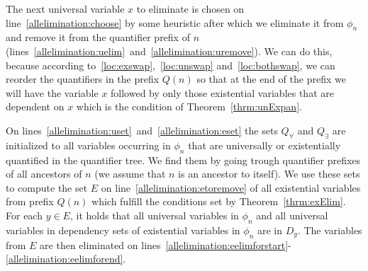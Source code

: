 \documentclass[
  digital, %
  color,
  twoside, %
  table,   %
  nolof,     %
  nolot,     %
]{fithesis3}
\theoremstyle{definition}
\theoremstyle{remark}
\newcommand{\prefix}[1]{Q({#1})}
\begin{document}
The next universal variable $x$ to eliminate is chosen on line~\ref{allelimination:choose} by some heuristic after which we eliminate it from $\phi_n$ and remove it from the quantifier prefix of $n$ (lines~\ref{allelimination:uelim}~and~\ref{allelimination:uremove}). We can do this, because according to~\eqref{loc:exswap},~\eqref{loc:unswap} and~\eqref{loc:bothswap}, we can reorder the quantifiers in the prefix $\prefix{n}$ so that at the end of the prefix we will have the variable $x$ followed by only those existential variables that are dependent on $x$ which is the condition of Theorem~\ref{thrm:unExpan}.

On lines~\ref{allelimination:uset}~and~\ref{allelimination:eset} the sets $Q_{\forall}$ and $Q_{\exists}$ are initialized to all variables occurring in $\phi_n$ that are universally or existentially quantified in the quantifier tree. We find them by going trough quantifier prefixes of all ancestors of $n$ (we assume that $n$ is an ancestor to itself). We use these sets to compute the set $E$ on line~\ref{allelimination:etoremove} of all existential variables from prefix $\prefix{n}$ which fulfill the conditions set by Theorem~\ref{thrm:exElim}. For each $y \in E$, it holds that all universal variables in $\phi_n$ and all universal variables in dependency sets of existential variables in $\phi_n$ are in $D_y$. The variables from $E$ are then eliminated on lines~\ref{allelimination:eelimforstart}-\ref{allelimination:eelimforend}.
\end{document}
